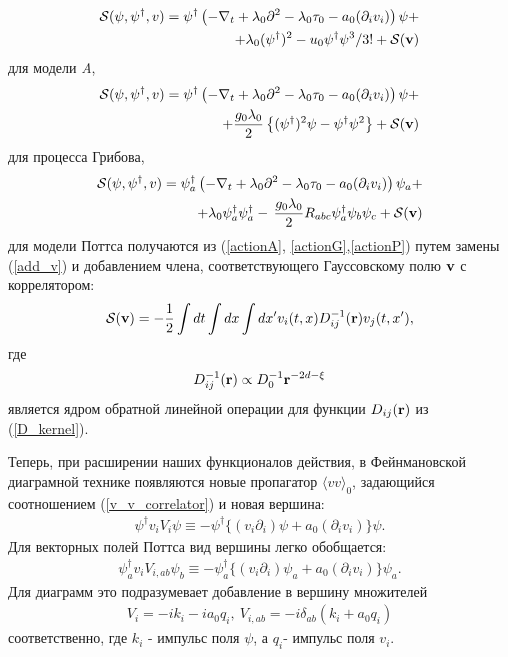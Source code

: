 \documentclass []{rusthesis} %
\def\S{{\mathcal S}}
\def\bfr{{\bf r}}
\def\bfv{{\bf v}}
\begin{document}
\begin{eqnarray}
\S(\psi,\psi^{\dagger},v) =  \psi^{\dagger}
\left(-\nabla_{t}+\lambda_{0} \partial^{2}- \lambda_{0}\tau_{0}-a_0(\partial_i v_i)\right)\psi +
\nonumber \\
+ \lambda_{0} (\psi^{\dagger})^2 - u_{0} \psi^{\dagger}\psi^3/3! + \S(\bfv)
\label{actionAT}
\end{eqnarray}
для модели {\it A},
\begin{eqnarray}
\S(\psi,\psi^{\dag},v) =  \psi^{\dag}
\left(-\nabla_{t}+\lambda_{0} \partial^{2}- \lambda_{0}\tau_{0}-a_0(\partial_i v_i)\right) \psi+ 
\nonumber \\
+\frac{g_{0}\lambda_{0}}{2} \left\{ (\psi^{\dagger})^2\psi -
\psi^{\dagger}\psi^2  \right\} + \S(\bfv)
\label{actionGT}
\end{eqnarray}
для процесса Грибова,
\begin{eqnarray}
\S(\psi,\psi^{\dagger},v) =  \psi^{\dagger}_a
\left(-\nabla_{t}+\lambda_{0} \partial^{2}- \lambda_{0}\tau_{0} -a_0(\partial_i v_i)\right)
\psi_a +
\nonumber \\
+\lambda_{0} \psi_a^{\dagger} \psi_a^{\dagger}-\,
\frac{g_{0}\lambda_0}{2} R_{abc}\psi_a^{\dagger}\psi_b\psi_c + \S(\bfv)
\label{actionPT}
\end{eqnarray}
для модели Поттса получаются из (\ref{actionA}, \ref{actionG},\ref{actionP})  путем замены (\ref{add_v}) и добавлением члена, соответствующего Гауссовскому полю $\bfv$ с коррелятором:
\begin{eqnarray}
\S(\bfv) = -\frac{1}{2}\int dt \int dx \int dx' v_i(t,x) D^{-1}_{ij}(\bfr)v_j(t,x'),
\label{actionV}
\end{eqnarray}
где
\[
D^{-1}_{ij}(\bfr) \propto D^{-1}_0 \bfr^{-2d-\xi}
\]
является ядром обратной линейной операции для функции $D_{ij}(\bfr)$ из (\ref{D_kernel}).

Теперь, при расширении наших функционалов действия, в Фейнмановской диаграмной технике появляются новые пропагатор $\langle vv\rangle_0$, задающийся соотношением (\ref{v_v_correlator}) и новая вершина:
\begin{eqnarray}
\psi^{\dag}v_iV_i\psi \equiv -\psi^{\dag}\lbrace(v_i\partial_i)\psi+a_0(\partial_i v_i)\rbrace\psi.
\label{vpsipsi}
\end{eqnarray}
Для векторных полей Поттса вид вершины легко обобщается:
\begin{eqnarray}
\psi^{\dag}_av_iV_{i,ab}\psi_b \equiv -\psi^{\dag}_a\lbrace(v_i\partial_i)\psi_a+a_0(\partial_i v_i)\rbrace\psi_a.
\label{vpsipsi_index}
\end{eqnarray}
Для диаграмм это подразумевает добавление в вершину множителей
\begin{eqnarray}
V_i=-ik_i-ia_0q_i, \ V_{i,ab}=-i\delta_{ab}(k_i+a_0q_i)
\label{vpsipsi_vertex}
\end{eqnarray}
соответственно, где $k_i$ - импульс поля $\psi$, а $q_i$- импульс поля $v_i$.
\end{document}

